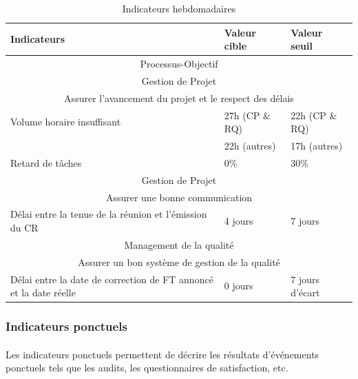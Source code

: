 \begin{table}[H]

\begin{tabular}[h]{|p{}|p{}|p{}|}
	\hline
	\rowcolor[gray]{0.85}
	Indicateurs & Valeur cible & Valeur seuil \\\hline
	\multicolumn{3}{|c|}{Processus-Objectif} \\\hline
	\multicolumn{3}{|c|}{\cellcolor[gray]{0.85} Gestion de Projet} \\
	\multicolumn{3}{|c|}{\cellcolor[gray]{0.85} Assurer l'avancement du projet et le respect des délais} \\\hline
	Volume horaire insuffisant & 27h (CP \& RQ) & 22h (CP \& RQ)  \\
	 & 22h (autres) & 17h (autres)  \\\hline
	Retard de tâches & 0\% & 30\% \\\hline
	\multicolumn{3}{|c|}{\cellcolor[gray]{0.85} Gestion de Projet} \\
	\multicolumn{3}{|c|}{\cellcolor[gray]{0.85} Assurer une bonne communication} \\\hline
	Délai entre la tenue de la réunion et l'émission du CR & 4 jours & 7 jours \\\hline
	\multicolumn{3}{|c|}{\cellcolor[gray]{0.85} Management de la qualité} \\
	\multicolumn{3}{|c|}{\cellcolor[gray]{0.85} Assurer un bon système de gestion de la qualité} \\\hline
	Délai entre la date de correction de FT annoncé et la date réelle & 0 jours & 7 jours d'écart \\\hline
	
\end{tabular}
\caption{Indicateurs hebdomadaires} \label{Tableau 6.1}
\end{table}


\subsubsection*{Indicateurs ponctuels}
\label{Indicateurs ponctuels}
\paragraph*{} Les indicateurs ponctuels permettent de décrire les résultats d’événements ponctuels tels que les audits, les questionnaires de satisfaction, etc.

